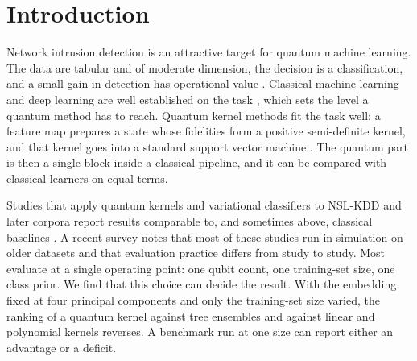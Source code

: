 \section{Introduction}\label{sec:intro}

Network intrusion detection is an attractive target for quantum machine learning. The data
are tabular and of moderate dimension, the decision is a classification, and a small gain in
detection has operational value \cite{ref24}. Classical machine learning and deep learning are
well established on the task \cite{ref1,ref2,ref3}, which sets the level a quantum method has to
reach. Quantum kernel methods fit the task well: a feature map prepares a state whose
fidelities form a positive semi-definite kernel, and that kernel goes into a standard support
vector machine \cite{havlicek2019,schuld2019}. The quantum part is then a single block inside a
classical pipeline, and it can be compared with classical learners on equal terms.

Studies that apply quantum kernels and variational classifiers to NSL-KDD \cite{ref4} and later
corpora \cite{ref25} report results comparable to, and sometimes above, classical baselines
\cite{ref13,ref14,ref15}. A recent survey \cite{kaissar2026} notes that most of these studies run
in simulation on older datasets and that evaluation practice differs from study to study. Most
evaluate at a single operating point: one qubit count, one training-set size, one class prior.
We find that this choice can decide the result. With the embedding fixed at four principal
components and only the training-set size varied, the ranking of a quantum kernel against
tree ensembles and against linear and polynomial kernels reverses. A benchmark run at one size
can report either an advantage or a deficit.

